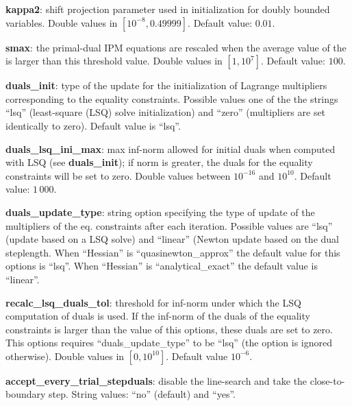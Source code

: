 \documentclass[11pt]{article}
\newcounter{line}
\begin{document}
\medskip


\noindent \textbf{kappa2}: shift projection parameter used in initialization for doubly bounded variables. Double values in $[10^{-8},0.49999]$. Default value: $0.01$. 

\medskip

\noindent \textbf{smax}: the primal-dual IPM equations are rescaled when the average value of the is larger than this threshold value. Double values in $[1,10^7]$. Default value: $100$. 

\medskip


\noindent \textbf{duals\_init}: type of the update for the initialization of Lagrange multipliers corresponding to  the equality constraints. Possible values one of the the strings ``lsq'' (least-square (LSQ) solve initialization) and ``zero'' (multipliers are set identically to zero). Default value is ``lsq''.

\medskip

\noindent \textbf{duals\_lsq\_ini\_max}: max inf-norm allowed for initial duals when computed with LSQ (see \textbf{duals\_init}); if norm is greater, the duals for the equality constraints will be set to zero. Double values between $10^{-16}$ and $10^{10}$. Default value: $1\,000$.

\medskip


\noindent \textbf{duals\_update\_type}: string option specifying the type of update of the multipliers of the eq. constraints after each iteration. Possible values are ``lsq'' (update based on a LSQ solve) and ``linear'' (Newton update based on the dual steplength. When ``Hessian'' is ``quasinewton\_approx'' the default value for this options is ``lsq''. When ``Hessian'' is ``analytical\_exact'' the default value is ``linear''.

\medskip

\noindent \textbf{recalc\_lsq\_duals\_tol}: threshold for inf-norm under which the LSQ computation of duals is used. If the inf-norm of the duals of the equality constraints is larger than the value of this options, these duals are set to zero. This options requires ``duals\_update\_type'' to be ``lsq'' (the option is ignored otherwise). Double values in $[0,10^{10}]$. Default value $10^{-6}$.


\medskip

\noindent \textbf{accept\_every\_trial\_stepduals}: disable the line-search and take the close-to-boundary step. String values: ``no'' (default) and ``yes''.
\end{document}
